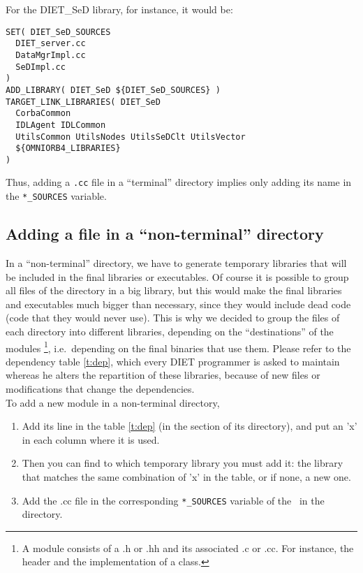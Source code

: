 For the \textsf{DIET\_SeD} library, for instance, it would be:
\begin{verbatim}
SET( DIET_SeD_SOURCES
  DIET_server.cc
  DataMgrImpl.cc
  SeDImpl.cc
)
ADD_LIBRARY( DIET_SeD ${DIET_SeD_SOURCES} )
TARGET_LINK_LIBRARIES( DIET_SeD
  CorbaCommon
  IDLAgent IDLCommon
  UtilsCommon UtilsNodes UtilsSeDClt UtilsVector
  ${OMNIORB4_LIBRARIES}
)
\end{verbatim}

Thus, adding a \texttt{.cc} file in a ``terminal'' directory implies
only adding its name in the \texttt{*\_SOURCES} variable.

\subsection{Adding a file in a ``non-terminal'' directory}

In a ``non-terminal'' directory, we have to generate temporary
libraries that will be included in the final libraries
or executables. Of course it is possible to group all files of the
directory in a big library, but this would make the final libraries
and executables much bigger than necessary, since they would include
dead code (code that they would never use).
This is why we decided to group the files of each directory into
different libraries, depending on the ``destinations''
of the modules
\footnote{A module consists of a \textsf{.h} or
\textsf{.hh} and its associated \textsf{.c} or \textsf{.cc}.
For instance, the header and the implementation of a class.},
i.e.~depending on the final binaries that use them.
Please refer to the dependency table \ref{t:dep}, which every
DIET programmer is asked to maintain whereas he alters the repartition
of these libraries, because of new files or modifications that
change the dependencies.  \\

\noindent
To add a new module in a non-terminal directory,
\begin{enumerate}
\item Add its line in the table \ref{t:dep} (in the section of its
  directory), and put an 'x' in each column where it is used.
\item Then you can find to which temporary library you must add it:
  the library that matches the same combination of 'x' in the table,
  or if none, a new one.
\item Add the \textsf{.cc} file in the corresponding
  \texttt{*\_SOURCES} variable of the \CMakeLists\ in the directory.
\end{enumerate}

